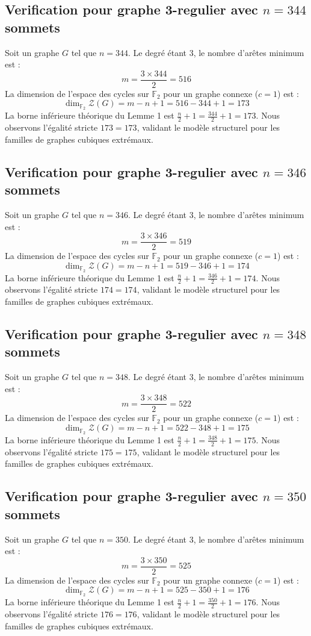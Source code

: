 \documentclass[11pt,a4paper]{article}
\begin{document}
\subsection{Verification pour graphe 3-regulier avec $n=344$ sommets}
Soit un graphe $G$ tel que $n = 344$. Le degré étant 3, le nombre d'arêtes minimum est :
$$ m = \frac{3 \times 344}{2} = 516 $$
La dimension de l'espace des cycles sur $\mathbb{F}_2$ pour un graphe connexe ($c=1$) est :
$$ \dim_{\mathbb{F}_2} \mathcal{Z}(G) = m - n + 1 = 516 - 344 + 1 = 173 $$
La borne inférieure théorique du Lemme 1 est $\frac{n}{2} + 1 = \frac{344}{2} + 1 = 173$.
Nous observons l'égalité stricte $173 = 173$, validant le modèle structurel pour les familles de graphes cubiques extrémaux.

\subsection{Verification pour graphe 3-regulier avec $n=346$ sommets}
Soit un graphe $G$ tel que $n = 346$. Le degré étant 3, le nombre d'arêtes minimum est :
$$ m = \frac{3 \times 346}{2} = 519 $$
La dimension de l'espace des cycles sur $\mathbb{F}_2$ pour un graphe connexe ($c=1$) est :
$$ \dim_{\mathbb{F}_2} \mathcal{Z}(G) = m - n + 1 = 519 - 346 + 1 = 174 $$
La borne inférieure théorique du Lemme 1 est $\frac{n}{2} + 1 = \frac{346}{2} + 1 = 174$.
Nous observons l'égalité stricte $174 = 174$, validant le modèle structurel pour les familles de graphes cubiques extrémaux.

\subsection{Verification pour graphe 3-regulier avec $n=348$ sommets}
Soit un graphe $G$ tel que $n = 348$. Le degré étant 3, le nombre d'arêtes minimum est :
$$ m = \frac{3 \times 348}{2} = 522 $$
La dimension de l'espace des cycles sur $\mathbb{F}_2$ pour un graphe connexe ($c=1$) est :
$$ \dim_{\mathbb{F}_2} \mathcal{Z}(G) = m - n + 1 = 522 - 348 + 1 = 175 $$
La borne inférieure théorique du Lemme 1 est $\frac{n}{2} + 1 = \frac{348}{2} + 1 = 175$.
Nous observons l'égalité stricte $175 = 175$, validant le modèle structurel pour les familles de graphes cubiques extrémaux.

\subsection{Verification pour graphe 3-regulier avec $n=350$ sommets}
Soit un graphe $G$ tel que $n = 350$. Le degré étant 3, le nombre d'arêtes minimum est :
$$ m = \frac{3 \times 350}{2} = 525 $$
La dimension de l'espace des cycles sur $\mathbb{F}_2$ pour un graphe connexe ($c=1$) est :
$$ \dim_{\mathbb{F}_2} \mathcal{Z}(G) = m - n + 1 = 525 - 350 + 1 = 176 $$
La borne inférieure théorique du Lemme 1 est $\frac{n}{2} + 1 = \frac{350}{2} + 1 = 176$.
Nous observons l'égalité stricte $176 = 176$, validant le modèle structurel pour les familles de graphes cubiques extrémaux.
\end{document}
